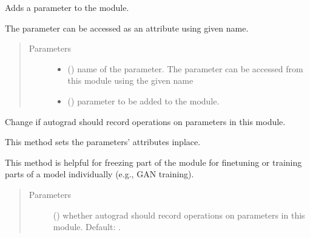 \documentclass[letterpaper,10pt,english]{sphinxmanual}
\begin{document}
\begin{fulllineitems}

\begin{fulllineitems}
\label{\detokenize{api/dynamics:geology.metamodelling.dynamics.LatentSpaceDynamics.register_parameter}}
Adds a parameter to the module.

The parameter can be accessed as an attribute using given name.
\begin{quote}\begin{description}
\item[{Parameters}] \leavevmode\begin{itemize}
\item {} 
 () \textendash{} name of the parameter. The parameter can be accessed
from this module using the given name

\item {} 
 () \textendash{} parameter to be added to the module.

\end{itemize}

\end{description}\end{quote}

\end{fulllineitems}


\begin{fulllineitems}
\label{\detokenize{api/dynamics:geology.metamodelling.dynamics.LatentSpaceDynamics.requires_grad_}}
Change if autograd should record operations on parameters in this
module.

This method sets the parameters’  attributes
in\sphinxhyphen{}place.

This method is helpful for freezing part of the module for finetuning
or training parts of a model individually (e.g., GAN training).
\begin{quote}\begin{description}
\item[{Parameters}] \leavevmode
{} () \textendash{} whether autograd should record operations on
parameters in this module. Default: .


\end{description}
\end{quote}
\end{fulllineitems}
\end{fulllineitems}
\end{document}
